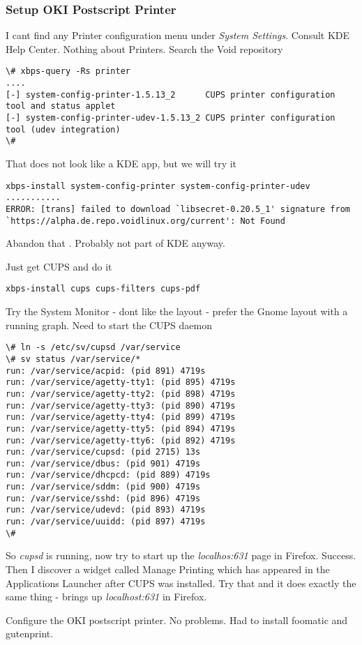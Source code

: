 \documentclass{article}  %
\begin{document}
\subsubsection{Setup OKI Postscript Printer}
I cant find any Printer configuration menu under {\em System Settings}. Consult KDE Help Center. Nothing about Printers. Search the Void repository 
\begin{verbatim}
\# xbps-query -Rs printer
....
[-] system-config-printer-1.5.13_2      CUPS printer configuration tool and status applet
[-] system-config-printer-udev-1.5.13_2 CUPS printer configuration tool (udev integration)
\# 
\end{verbatim}
That does not look like a KDE app, but we will try it
\begin{verbatim}
xbps-install system-config-printer system-config-printer-udev
...........
ERROR: [trans] failed to download `libsecret-0.20.5_1' signature from `https://alpha.de.repo.voidlinux.org/current': Not Found
\end{verbatim}
Abandon that . Probably not part of KDE anyway.

Just get CUPS and do it
\begin{verbatim}
xbps-install cups cups-filters cups-pdf
\end{verbatim}
Try the System Monitor - dont like the layout - prefer the Gnome layout with a running graph.
Need to start the CUPS daemon
\begin{verbatim}
\# ln -s /etc/sv/cupsd /var/service
\# sv status /var/service/*
run: /var/service/acpid: (pid 891) 4719s
run: /var/service/agetty-tty1: (pid 895) 4719s
run: /var/service/agetty-tty2: (pid 898) 4719s
run: /var/service/agetty-tty3: (pid 890) 4719s
run: /var/service/agetty-tty4: (pid 899) 4719s
run: /var/service/agetty-tty5: (pid 894) 4719s
run: /var/service/agetty-tty6: (pid 892) 4719s
run: /var/service/cupsd: (pid 2715) 13s
run: /var/service/dbus: (pid 901) 4719s
run: /var/service/dhcpcd: (pid 889) 4719s
run: /var/service/sddm: (pid 900) 4719s
run: /var/service/sshd: (pid 896) 4719s
run: /var/service/udevd: (pid 893) 4719s
run: /var/service/uuidd: (pid 897) 4719s
\# 
\end{verbatim}
So {\em cupsd} is running, now try to start up the {\em localhos:631} page in Firefox. Success.
Then I discover a widget called Manage Printing which has appeared in the Applications Launcher after CUPS was installed. Try that and it does exactly the same thing - brings up {\em localhost:631} in Firefox. 

Configure the OKI postscript printer. No problems. Had to install foomatic and gutenprint.
\end{document}
